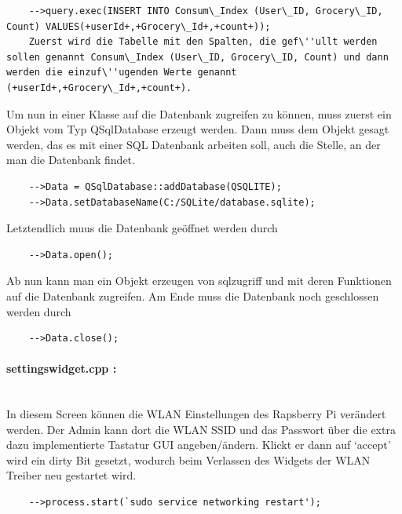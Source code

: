 \documentclass[11pt,a4paper]{article} %
\begin{document}
	\begin{frame}

\begin{lstlisting}
	-->query.exec(INSERT INTO Consum\_Index (User\_ID, Grocery\_ID, Count) VALUES(+userId+,+Grocery\_Id+,+count+));
	Zuerst wird die Tabelle mit den Spalten, die gef\''ullt werden sollen genannt Consum\_Index (User\_ID, Grocery\_ID, Count) und dann werden die einzuf\''ugenden Werte genannt (+userId+,+Grocery\_Id+,+count+).
	\end{lstlisting}
\end{frame}
\par	
	Um nun in einer Klasse auf die Datenbank zugreifen zu können, muss zuerst ein Objekt vom Typ QSqlDatabase erzeugt werden. Dann muss dem Objekt gesagt werden, das es mit einer SQL Datenbank arbeiten soll,
	auch die Stelle, an der man die Datenbank findet.
	\begin{frame}

\begin{lstlisting}
	-->Data = QSqlDatabase::addDatabase(QSQLITE);
	-->Data.setDatabaseName(C:/SQLite/database.sqlite);
	\end{lstlisting}
\end{frame}
\par	
	Letztendlich muus die Datenbank geöffnet werden durch
	\begin{frame}

\begin{lstlisting}
	-->Data.open();
		\end{lstlisting}
\end{frame}
	Ab nun kann man ein Objekt erzeugen von sqlzugriff und mit deren Funktionen auf die Datenbank zugreifen.
	Am Ende muss die Datenbank noch geschlossen werden durch
		\begin{frame}

\begin{lstlisting}
	-->Data.close();
	\end{lstlisting}
\end{frame}
\par	
\paragraph{settingswidget.cpp :} $\;$ \\
	In diesem Screen können die WLAN Einstellungen des Rapsberry Pi verändert werden. Der Admin kann dort die WLAN SSID und das Passwort über die extra dazu implementierte Tastatur GUI angeben/ändern.
	Klickt er dann auf `accept' wird ein dirty Bit gesetzt, wodurch beim Verlassen des Widgets der WLAN Treiber neu gestartet wird. 
	\begin{frame}

\begin{lstlisting}
	-->process.start(`sudo service networking restart');
	\end{lstlisting}
\end{frame}
\par	
\end{document}

